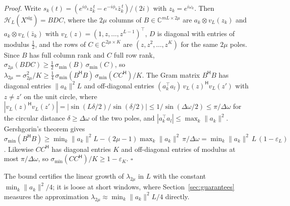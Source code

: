 \documentclass{article}
\begin{document}
\textit{Proof.} Write $s_k(t) = (e^{i\phi_k} z_k^{\,t} - e^{-i\phi_k} \bar{z}_k^{\,t})/(2i)$ with $z_k = e^{i\omega_k}$. Then $\mathcal{H}_L(X^{\mathrm{sig}}) = B D C$, where the $2\mu$ columns of $B \in \mathbb{C}^{mL \times 2\mu}$ are $a_k \otimes v_L(z_k)$ and $a_k \otimes v_L(\bar{z}_k)$ with $v_L(z) = (1, z, \dots, z^{L-1})^{\top}$, $D$ is diagonal with entries of modulus $\tfrac{1}{2}$, and the rows of $C \in \mathbb{C}^{2\mu \times K}$ are $(z, z^{2}, \dots, z^{K})$ for the same $2\mu$ poles. Since $B$ has full column rank and $C$ full row rank, $\sigma_{2\mu}(BDC) \ge \tfrac{1}{2}\, \sigma_{\min}(B)\, \sigma_{\min}(C)$, so $\lambda_{2\mu} = \sigma_{2\mu}^{2}/K \ge \tfrac{1}{4}\, \sigma_{\min}(B^{\mathsf{H}} B)\, \sigma_{\min}(C C^{\mathsf{H}})/K$. The Gram matrix $B^{\mathsf{H}} B$ has diagonal entries $\lVert a_k \rVert^{2} L$ and off-diagonal entries $(a_k^{\top} a_l)\, v_L(z)^{\mathsf{H}} v_L(z')$ with $z \ne z'$ on the unit circle, where $|v_L(z)^{\mathsf{H}} v_L(z')| = |\sin(L\delta/2)/\sin(\delta/2)| \le 1/\sin(\Delta\omega/2) \le \pi/\Delta\omega$ for the circular distance $\delta \ge \Delta\omega$ of the two poles, and $|a_k^{\top} a_l| \le \max_k \lVert a_k \rVert^{2}$. Gershgorin's theorem gives $\sigma_{\min}(B^{\mathsf{H}} B) \ge \min_k \lVert a_k \rVert^{2} L - (2\mu - 1) \max_k \lVert a_k \rVert^{2}\, \pi/\Delta\omega = \min_k \lVert a_k \rVert^{2}\, L\,(1 - \varepsilon_L)$. Likewise $C C^{\mathsf{H}}$ has diagonal entries $K$ and off-diagonal entries of modulus at most $\pi/\Delta\omega$, so $\sigma_{\min}(C C^{\mathsf{H}})/K \ge 1 - \varepsilon_K$. $\square$

The bound certifies the linear growth of $\lambda_{2\mu}$ in $L$ with the constant $\min_k \lVert a_k \rVert^{2}/4$; it is loose at short windows, where Section~\ref{sec:guarantees} measures the approximation $\lambda_{2\mu} \approx \min_k \lVert a_k \rVert^{2} L/4$ directly.
\end{document}
